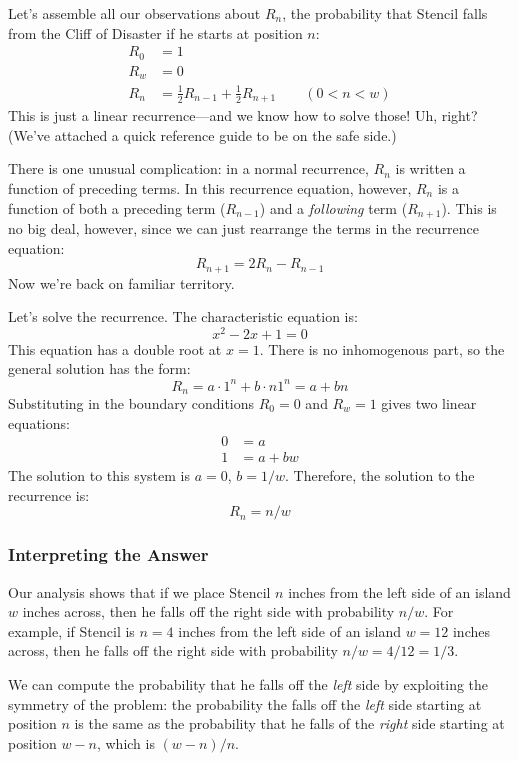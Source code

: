 Let's assemble all our observations about $R_n$, the probability that
Stencil falls from the Cliff of Disaster if he starts at position $n$:
%
\[
\begin{array}{rl}
R_0 & = 1 \\
R_w & = 0 \\
R_n & = \frac{1}{2} R_{n-1} + \frac{1}{2} R_{n+1} \qquad (0 < n < w)
\end{array}
\]
%
This is just a linear recurrence---and we know how to solve those!
Uh, right?  (We've attached a quick reference guide to be on the safe
side.)

There is one unusual complication: in a normal recurrence, $R_n$ is
written a function of preceding terms.  In this recurrence equation,
however, $R_n$ is a function of both a preceding term ($R_{n-1}$) and
a \emph{following} term ($R_{n+1}$).  This is no big deal, however,
since we can just rearrange the terms in the recurrence equation:
%
\[
R_{n+1} = 2 R_n - R_{n-1}
\]
%
Now we're back on familiar territory.

% 

Let's solve the recurrence.  The characteristic equation is:
%
\[
x^2 - 2 x + 1 = 0
\]
%
This equation has a double root at $x = 1$.  There is no inhomogenous
part, so the general solution has the form:
%
\[
R_n = a \cdot 1^n + b \cdot n 1^n = a + b n
\]
%
Substituting in the boundary conditions $R_0 = 0$ and $R_w = 1$ gives
two linear equations:
%
\begin{align*}
0 & = a \\
1 & = a + b w
\end{align*}
%
The solution to this system is $a = 0$, $b = 1 / w$.  Therefore, the
solution to the recurrence is:
%
\[
R_n = n / w
\]

\subsubsection*{Interpreting the Answer}

Our analysis shows that if we place Stencil $n$ inches from the left
side of an island $w$ inches across, then he falls off the right side
with probability $n / w$.  For example, if Stencil is $n = 4$ inches
from the left side of an island $w = 12$ inches across, then he falls
off the right side with probability $n / w = 4 / 12 = 1 / 3$.

We can compute the probability that he falls off the \emph{left}
side by exploiting the symmetry of the problem: the probability the
falls off the \emph{left} side starting at position $n$ is the same
as the probability that he falls of the \emph{right} side starting
at position $w - n$, which is $(w - n) / n$.

